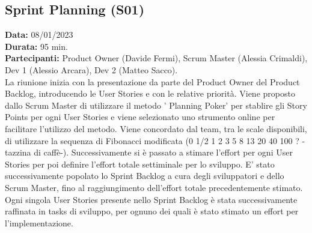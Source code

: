\documentclass[a4paper, oneside]{article}
\newcommand\uno{Scrum Master (Alessia Crimaldi), Dev 1 (Alessio Arcara), Dev 2 (Matteo Sacco).}
\newcommand\unoP{Product Owner (Davide Fermi), }
\begin{document}
\begin{landscape}
        \subsection{Sprint Planning (S01)}
        \textbf{Data:} 08/01/2023\\
        \textbf{Durata:} 95 min.\\
        \textbf{Partecipanti:} \unoP \uno\\
        \newline La riunione inizia con la presentazione da parte del Product Owner del Product Backlog, introducendo le User Stories e con le relative priorità. Viene proposto dallo Scrum Master di utilizzare il metodo ' Planning Poker' per stablire gli Story Points per ogni User Stories e viene selezionato uno strumento online per facilitare l'utilizzo del metodo. Viene concordato dal team, tra le scale disponibili, di utilizzare la sequenza di Fibonacci modificata (0  1/2  1  2  3  5  8  13  20  40  100  ?  -tazzina di caffè-). Successivamente si è passato a stimare l'effort per ogni User Stories per poi definire l'effort totale settiminale per lo sviluppo. E' stato successivamente popolato lo Sprint Backlog a cura degli sviluppatori e dello Scrum Master, fino al raggiungimento dell'effort totale precedentemente stimato. Ogni singola User Stories presente nello Sprint Backlog è stata successivamente raffinata in tasks di sviluppo, per ognuno dei quali è stato stimato un effort per l'implementazione.

        \newpage

\end{landscape}
\end{document}
